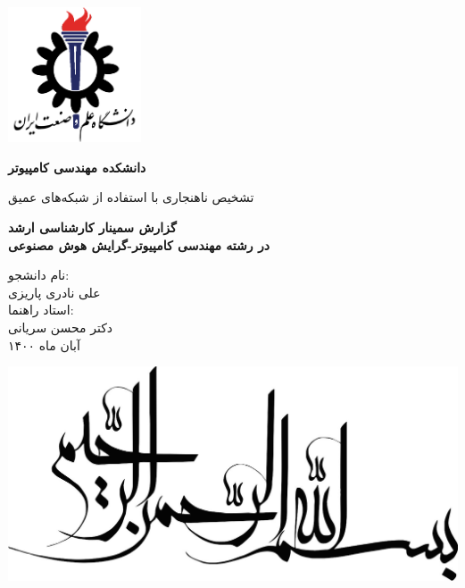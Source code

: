 \documentclass[12pt,a4paper]{article}
\theoremstyle{definition}
\theoremstyle{theorem}
\theoremstyle{definition}
\begin{document}
	\thispagestyle{empty}
	\vspace*{25mm}
	\centerline{\includegraphics[height=4cm]{./images/logos/iust.png}}

	\begin{center}
	\textbf{
		دانشکده مهندسی کامپیوتر
	}
	\\[1cm]
	\baselineskip=2cm
	{\titr
	\begin{Huge}
	تشخیص ناهنجاری با استفاده از شبکه‌های عمیق\\[1cm]
	\end{Huge}}
	{\Large 
		\textbf{
			گزارش سمینار کارشناسی ارشد\\
			در رشته مهندسی کامپیوتر-گرایش هوش مصنوعی
		} \\[1cm]
	}

	{\Large {\traffic 
	نام دانشجو:
	}
	\\[.5cm]
	{\Large \nastaliq علی نادری پاریزی }
	\\
	{\Large\traffic  
		استاد راهنما:
	}}
	\\
	{\Large \nastaliq دکتر محسن سریانی}
	\\[.6cm]
	آبان ماه ۱۴۰۰
	\end{center}

	\newpage
		\begin{center}
		\includegraphics[scale=1]{./images/logos/in-the-name-of-god.jpeg}
		\end{center}
	\newpage
	
\end{document}
